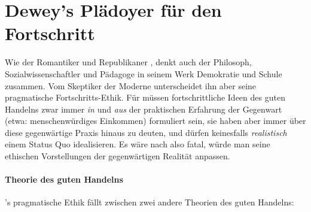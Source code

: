 \section[Epilog]{Dewey's Plädoyer für den Fortschritt}

Wie der Romantiker und Republikaner \citeauthor{rousseau-1762}, denkt auch der Philosoph, Sozialwissenschaftler und Pädagoge \citeauthor{Dewey2010} in seinem Werk Demokratie und Schule zusammen.
Vom Skeptiker der Moderne \citeauthor{Rousseau-1762-b} unterscheidet ihn aber seine pragmatische Fortschritts-Ethik.
Für \citeauthor{Dewey2010} müssen fortschrittliche Ideen des guten Handelns zwar immer \emph{in} und \emph{aus} der praktischen Erfahrung der Gegenwart (etwa: menschenwürdiges Einkommen) formuliert sein, sie haben aber immer über diese gegenwärtige Praxis hinaus zu deuten, und dürfen keinesfalls \emph{realistisch} einem Status Quo idealisieren.
Es wäre nach \citeauthor{Dewey2010} also fatal, würde man seine ethischen Vorstellungen der gegenwärtigen Realität anpassen.


\paragraph{Theorie des guten Handelns}

\citeauthor{Dewey1932}'s pragmatische Ethik fällt zwischen zwei andere Theorien des guten Handelns:

